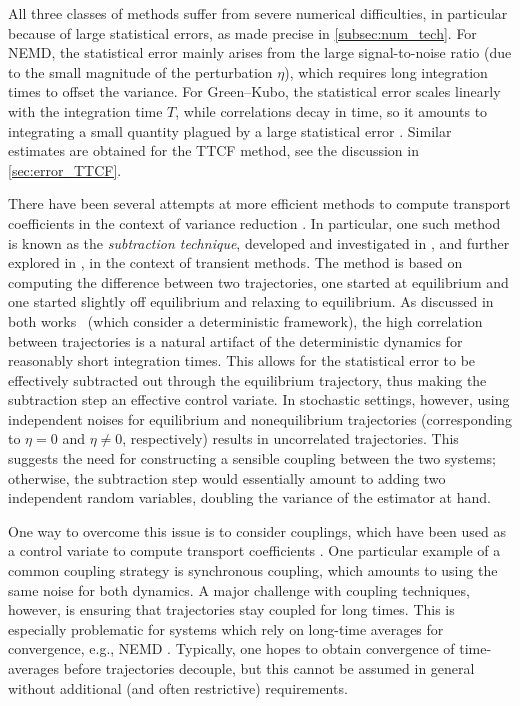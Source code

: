 \documentclass[11pt]{article}
\theoremstyle{definition}
\begin{document}
All three classes of methods suffer from severe numerical difficulties, in particular because of large statistical errors, as made precise in \cref{subsec:num_tech}. For NEMD, the statistical error mainly arises from the large signal-to-noise ratio (due to the small magnitude of the perturbation $\eta$), which requires long integration times to offset the variance. For Green--Kubo, the statistical error scales linearly with the integration time $T$, while correlations decay in time, so it amounts to integrating a small quantity plagued by a large statistical error \cite{sousaoliveira2017}. Similar estimates are obtained for the TTCF method, see the discussion in \cref{sec:error_TTCF}. 

There have been several attempts at more efficient methods to compute transport coefficients in the context of variance reduction \cite{pavliotis2023,spacek2023,blassel2024}. In particular, one such method is known as the \emph{subtraction technique}, developed and investigated in \cite{ciccotti1975}, and further explored in \cite{ciccotti1979}, in the context of transient methods. The method is based on computing the difference between two trajectories, one started at equilibrium and one started slightly off equilibrium and relaxing to equilibrium. As discussed in both works~\cite{ciccotti1975,ciccotti1979} (which consider a deterministic framework), the high correlation between trajectories is a natural artifact of the deterministic dynamics for reasonably short integration times. This allows for the statistical error to be effectively subtracted out through the equilibrium trajectory, thus making the subtraction step an effective control variate. In stochastic settings, however, using independent noises for equilibrium and nonequilibrium trajectories (corresponding to $\eta=0$ and $\eta\ne 0$, respectively) results in uncorrelated trajectories. This suggests the need for constructing a sensible coupling between the two systems; otherwise, the subtraction step would essentially amount to adding two independent random variables, doubling the variance of the estimator at hand. 

One way to overcome this issue is to consider couplings, which have been used as a control variate to compute transport coefficients \cite{goodman2009,garnier2022}. One particular example of a common coupling strategy is synchronous coupling, which amounts to using the same noise for both dynamics. A major challenge with coupling techniques, however, is ensuring that trajectories stay coupled for long times. This is especially problematic for systems which rely on long-time averages for convergence, e.g., NEMD \cite{darshan2024}. Typically, one hopes to obtain convergence of time-averages before trajectories decouple, but this cannot be assumed in general without additional (and often restrictive) requirements.
\end{document}
